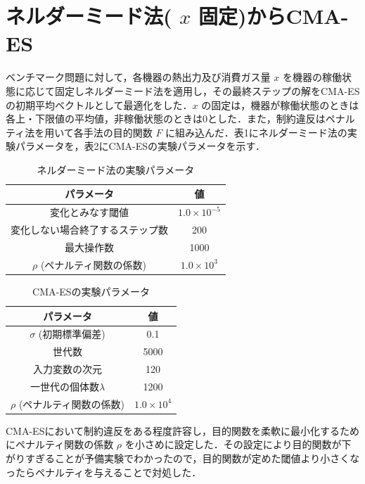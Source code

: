 \documentclass[twocolumn]{jarticle}
\begin{document}
\section{ネルダーミード法( $x$ 固定)からCMA-ES}
    ベンチマーク問題に対して，各機器の熱出力及び消費ガス量 $x$ を機器の稼働状態に応じて固定しネルダーミード法を適用し，その最終ステップの解をCMA-ESの初期平均ベクトルとして最適化をした．$x$ の固定は，機器が稼働状態のときは各上・下限値の平均値，非稼働状態のときは0とした．また，制約違反はペナルティ法を用いて各手法の目的関数 $F$ に組み込んだ．表1にネルダーミード法の実験パラメータを，表2にCMA-ESの実験パラメータを示す．
    \begin{table}[htbp]	%
        \begin{center}
            \caption{ネルダーミード法の実験パラメータ}
            \begin{tabular}{| c | c |} \hline
                パラメータ & 値 \\ \hline
                変化とみなす閾値 & $1.0\times10^{-5}$ \\ 
                変化しない場合終了するステップ数 & 200 \\
                最大操作数 & 1000 \\
                $\rho$ (ペナルティ関数の係数) & $1.0\times10^{3}$\\ \hline
            \end{tabular}
        \end{center}
    \end{table}
    \begin{table}[htbp] %
        \begin{center}
            \caption{CMA-ESの実験パラメータ}
            \begin{tabular}{| c | c |} \hline
                パラメータ & 値 \\ \hline
                $\sigma$ (初期標準偏差) &  0.1 \\
                世代数 & 5000 \\
                入力変数の次元 & 120 \\
                一世代の個体数$\lambda$ & 1200 \\
                $\rho$ (ペナルティ関数の係数) & $1.0\times10^{4}$\\ \hline
            \end{tabular}
        \end{center}
    \end{table}
    CMA-ESにおいて制約違反をある程度許容し，目的関数を柔軟に最小化するためにペナルティ関数の係数 $\rho$ を小さめに設定した．その設定により目的関数が下がりすぎることが予備実験でわかったので，目的関数が定めた閾値より小さくなったらペナルティを与えることで対処した．
    
\end{document}
